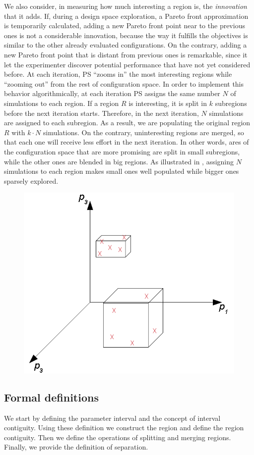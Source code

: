 We also consider, in measuring how much interesting a region is, the
\emph{innovation} that it adds. If, during a design space exploration,
a Pareto front approximation is temporarily calculated, adding a new Pareto front
point near to the previous ones is not a considerable innovation,
because the way it fulfills the objectives is similar to the other
already evaluated configurations. On the contrary, adding a new Pareto
front point that is distant from previous ones is remarkable,
since it let the experimenter discover potential performance that have not yet considered before.
At each iteration, PS ``zooms in'' the most interesting regions while ``zooming out'' from the rest of configuration space. In order to implement this behavior algorithmically, at each iteration PS assigns the same number $N$ of simulations to each region. If a region $R$ is interesting, it is split in $k$ subregions before the next iteration starts. Therefore, in the next iteration, $N$ simulations are assigned to each subregion. As a result, we are populating the original region $R$ with $k\cdot N$ simulations. On the contrary, uninteresting regions are merged, so that each one will receive less effort in the next iteration. In other words, ares of the configuration space that are more promising are split in small subregions, while the other ones are blended in big regions. As illustrated in , assigning $N$ simulations to each region makes small ones well populated while bigger ones sparsely explored.


	\begin{figure}[t]
	\center
	\includegraphics[width=0.5\columnwidth]{img/small_and_big}
	\end{figure}


\subsection{Formal definitions}
We start by defining the parameter interval and the concept of interval contiguity. Using these definition we construct the region and define the region contiguity. Then we define the operations of splitting and merging regions. Finally, we provide the definition of separation.

